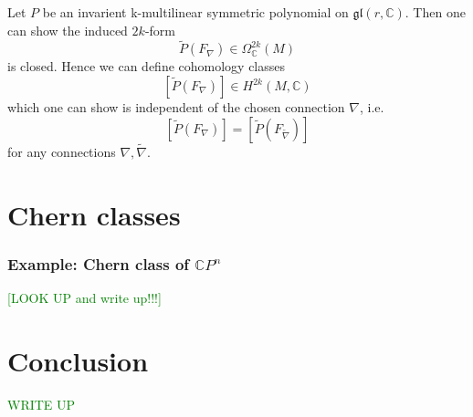 \documentclass[a4paper]{article}
\theoremstyle{definition} \newtheorem*{definition}{Definition}
\theoremstyle{definition} \newtheorem*{definitions}{Definitions}
\theoremstyle{plain} \newtheorem{theorem}{Theorem}[section]
\theoremstyle{plain} \newtheorem{proposition}[theorem]{Proposition}
\theoremstyle{plain} \newtheorem{corollary}[theorem]{Corollary}
\theoremstyle{plain} \newtheorem{lemma}[theorem]{Lemma}
\theoremstyle{plain} \newtheorem{example}[theorem]{Example}
\newcommand{\finish}[1]{\textcolor{green}{#1}}
\newcommand{\complexnos}{\mathbb{C}}
\begin{document}
Let $P$ be an invarient k-multilinear symmetric polynomial on $\mathfrak{gl}(r, \complexnos)$. Then one can show the induced $2k$-form 
$$\tilde{P}(F_\nabla)\in \Omega^{2k}_\complexnos(M)$$
is closed. Hence we can define cohomology classes
$$[\tilde{P}(F_\nabla)]\in H^{2k}(M, \complexnos)$$
which one can show is independent of the chosen connection $\nabla$, i.e.
$$[\tilde{P}(F_\nabla)]=[\tilde{P}(F_{\tilde{\nabla}} )]$$
for any connections $\nabla, \tilde{\nabla}$. 

\section{Chern classes}
\subsubsection{Example: Chern class of $\complexnos P^n$}
\finish{[LOOK UP and write up!!!]}

\section{Conclusion}
\finish{WRITE UP}
\end{document}
